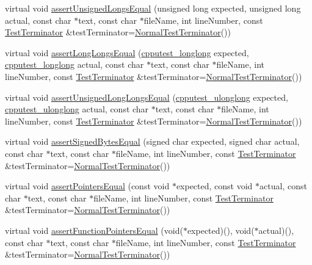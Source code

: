 \begin{DoxyCompactItemize}
\item 
virtual void \hyperlink{class_utest_shell_a5520c1138fffb8b742427512ba45f7c9}{assert\+Unsigned\+Longs\+Equal} (unsigned long expected, unsigned long actual, const char $\ast$text, const char $\ast$file\+Name, int line\+Number, const \hyperlink{class_test_terminator}{Test\+Terminator} \&test\+Terminator=\hyperlink{class_normal_test_terminator}{Normal\+Test\+Terminator}())
\item 
virtual void \hyperlink{class_utest_shell_a6e6e9c53326383b31d85583ccf4be4c3}{assert\+Long\+Longs\+Equal} (\hyperlink{structcpputest__longlong}{cpputest\+\_\+longlong} expected, \hyperlink{structcpputest__longlong}{cpputest\+\_\+longlong} actual, const char $\ast$text, const char $\ast$file\+Name, int line\+Number, const \hyperlink{class_test_terminator}{Test\+Terminator} \&test\+Terminator=\hyperlink{class_normal_test_terminator}{Normal\+Test\+Terminator}())
\item 
virtual void \hyperlink{class_utest_shell_ac4b53cc2ffb947f2e6ac8c19a531dfbb}{assert\+Unsigned\+Long\+Longs\+Equal} (\hyperlink{structcpputest__ulonglong}{cpputest\+\_\+ulonglong} expected, \hyperlink{structcpputest__ulonglong}{cpputest\+\_\+ulonglong} actual, const char $\ast$text, const char $\ast$file\+Name, int line\+Number, const \hyperlink{class_test_terminator}{Test\+Terminator} \&test\+Terminator=\hyperlink{class_normal_test_terminator}{Normal\+Test\+Terminator}())
\item 
virtual void \hyperlink{class_utest_shell_a74cb755b0e6c2186aa9735dc87e2d7ac}{assert\+Signed\+Bytes\+Equal} (signed char expected, signed char actual, const char $\ast$text, const char $\ast$file\+Name, int line\+Number, const \hyperlink{class_test_terminator}{Test\+Terminator} \&test\+Terminator=\hyperlink{class_normal_test_terminator}{Normal\+Test\+Terminator}())
\item 
virtual void \hyperlink{class_utest_shell_a511e5e49c21105966eee9f600a342455}{assert\+Pointers\+Equal} (const void $\ast$expected, const void $\ast$actual, const char $\ast$text, const char $\ast$file\+Name, int line\+Number, const \hyperlink{class_test_terminator}{Test\+Terminator} \&test\+Terminator=\hyperlink{class_normal_test_terminator}{Normal\+Test\+Terminator}())
\item 
virtual void \hyperlink{class_utest_shell_a48b33046ec189f0ce733205276afafa7}{assert\+Function\+Pointers\+Equal} (void($\ast$expected)(), void($\ast$actual)(), const char $\ast$text, const char $\ast$file\+Name, int line\+Number, const \hyperlink{class_test_terminator}{Test\+Terminator} \&test\+Terminator=\hyperlink{class_normal_test_terminator}{Normal\+Test\+Terminator}())

\end{DoxyCompactItemize}
